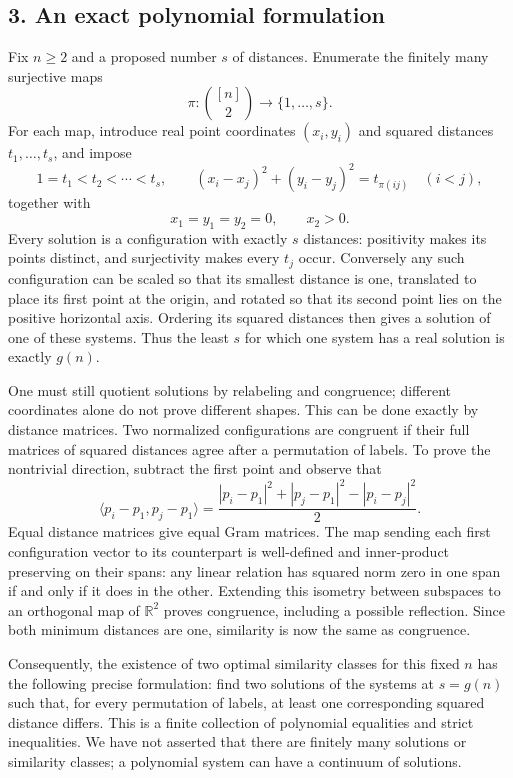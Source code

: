 \subsection*{3. An exact polynomial formulation}
Fix $n\ge2$ and a proposed number $s$ of distances. Enumerate the finitely many surjective maps
\[
 \pi:\binom{[n]}2\longrightarrow\{1,\ldots,s\}.
\]
For each map, introduce real point coordinates $(x_i,y_i)$ and squared distances $t_1,\ldots,t_s$, and impose
\[
 1=t_1<t_2<\cdots<t_s,\qquad
 (x_i-x_j)^2+(y_i-y_j)^2=t_{\pi(ij)}\quad(i<j),\tag{1}
\]
together with
\[
 x_1=y_1=y_2=0,\qquad x_2>0.\tag{2}
\]
Every solution is a configuration with exactly $s$ distances: positivity makes its points distinct, and surjectivity makes every $t_j$ occur. Conversely any such configuration can be scaled so that its smallest distance is one, translated to place its first point at the origin, and rotated so that its second point lies on the positive horizontal axis. Ordering its squared distances then gives a solution of one of these systems. Thus the least $s$ for which one system has a real solution is exactly $g(n)$.

One must still quotient solutions by relabeling and congruence; different coordinates alone do not prove different shapes. This can be done exactly by distance matrices. Two normalized configurations are congruent if their full matrices of squared distances agree after a permutation of labels. To prove the nontrivial direction, subtract the first point and observe that
\[
 \langle p_i-p_1,p_j-p_1\rangle
 =\frac{|p_i-p_1|^2+|p_j-p_1|^2-|p_i-p_j|^2}{2}.\tag{3}
\]
Equal distance matrices give equal Gram matrices. The map sending each first configuration vector to its counterpart is well-defined and inner-product preserving on their spans: any linear relation has squared norm zero in one span if and only if it does in the other. Extending this isometry between subspaces to an orthogonal map of $\mathbb R^2$ proves congruence, including a possible reflection. Since both minimum distances are one, similarity is now the same as congruence.

Consequently, the existence of two optimal similarity classes for this fixed $n$ has the following precise formulation: find two solutions of the systems at $s=g(n)$ such that, for every permutation of labels, at least one corresponding squared distance differs. This is a finite collection of polynomial equalities and strict inequalities. We have not asserted that there are finitely many solutions or similarity classes; a polynomial system can have a continuum of solutions.


